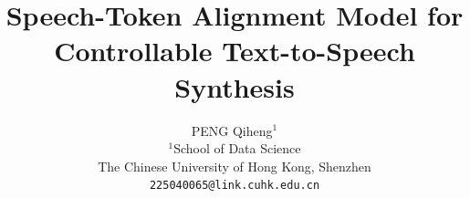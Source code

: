 \documentclass[10pt,twocolumn,letterpaper]{article}
\title{Speech-Token Alignment Model for Controllable Text-to-Speech Synthesis}
\author{PENG Qiheng$^{1}$\\
    $^{1}$School of Data Science\\
    The Chinese University of Hong Kong, Shenzhen\\
    {\tt\small 225040065@link.cuhk.edu.cn}
}
\begin{document}
\maketitle
    



{
    \small
    
    
}

% 
\end{document}
